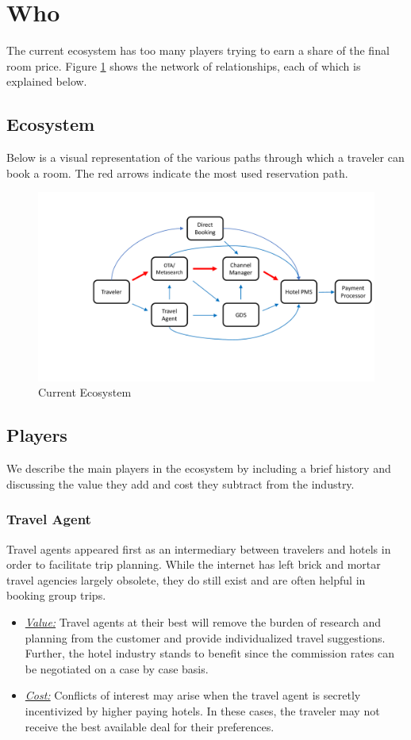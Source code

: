 \documentclass{article}
\begin{document}
\newpage
\section{Who}
The current ecosystem has too many players trying to earn a share of the final room price. Figure \ref{fig1} shows the network of relationships, each of which is explained below. 

\subsection{Ecosystem}
Below is a visual representation of the various paths through which a traveler can book a room. The red arrows indicate the most used reservation path.

\begin{figure}[H]
\centering
\includegraphics[width = \textwidth]{hotelEcosystem.pdf}
\caption{Current Ecosystem}
\label{fig1}
\end{figure}

\subsection{Players}
We describe the main players in the ecosystem by including a brief history and discussing the value they add and cost they subtract from the industry. 

\subsubsection{Travel Agent}
Travel agents appeared first as an intermediary between travelers and hotels in order to facilitate trip planning. While the internet has left brick and mortar travel agencies largely obsolete, they do still exist and are often helpful in booking group trips.
\begin{itemize}
 \item \underline{\textit{Value:}} Travel agents at their best will remove the burden of research and planning from the customer and provide individualized travel suggestions. Further, the hotel industry stands to benefit since the commission rates can be negotiated on a case by case basis.   
 \item \underline{\textit{Cost:}} Conflicts of interest may arise when the travel agent is secretly incentivized by higher paying hotels. In these cases, the traveler may not receive the best available deal for their preferences.
\end{itemize}
\end{document}
